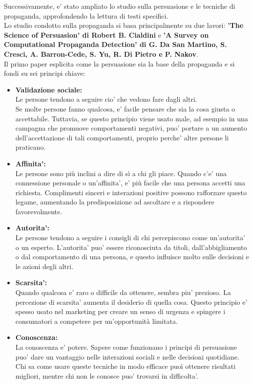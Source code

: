 \documentclass{article}
\begin{document}
Successivamente, e' stato ampliato lo studio sulla persuasione e le tecniche di propaganda, approfondendo la lettura di testi specifici.\\
Lo studio condotto sulla propaganda si basa principalmente su due lavori: \textbf{'The Science of Persuasion' di Robert B. Cialdini} e \textbf{'A Survey on Computational Propaganda Detection' di G. Da San Martino, S. Cresci, A. Barron-Cede, S. Yu, R. Di Pietro e P. Nakov}.\\
Il primo paper esplicita come la persuasione sia la base della propaganda e si fondi su sei principi chiave:
\begin{itemize}
	\item \textbf{Validazione sociale:}\\
	Le persone tendono a seguire cio' che vedono fare dagli altri.\\
	Se molte persone fanno qualcosa, e' facile pensare che sia la cosa giusta o accettabile. Tuttavia, se questo principio viene usato male, ad esempio in una campagna che promuove comportamenti negativi, puo' portare a un aumento dell'accettazione di tali comportamenti, proprio perche' altre persone li praticano.
	\item \textbf{Affinita':}\\
	Le persone sono più inclini a dire di sì a chi gli piace. Quando c’e' una connessione personale o un’affinita', e' più facile che una persona accetti una richiesta. Complimenti sinceri e interazioni positive possono rafforzare questo legame, aumentando la predisposizione ad ascoltare e a rispondere favorevolmente.
	\item \textbf{Autorita':}\\
	Le persone tendono a seguire i consigli di chi percepiscono come un'autorita' o un esperto. L'autorita' puo' essere riconosciuta da titoli, dall'abbigliamento o dal comportamento di una persona, e questo influisce molto sulle decisioni e le azioni degli altri.
	\item \textbf{Scarsita':}\\
	Quando qualcosa e' raro o difficile da ottenere, sembra piu' prezioso. La percezione di scarsita' aumenta il desiderio di quella cosa. Questo principio e' spesso usato nel marketing per creare un senso di urgenza e spingere i consumatori a competere per un'opportunità limitata.
	\item \textbf{Conoscenza:}\\
	La conoscenza e' potere. Sapere come funzionano i principi di persuasione puo' dare un vantaggio nelle interazioni sociali e nelle decisioni quotidiane. Chi sa come usare queste tecniche in modo efficace puoì ottenere risultati migliori, mentre chi non le conosce puo' trovarsi in difficolta'.
\end{itemize}
\end{document}
